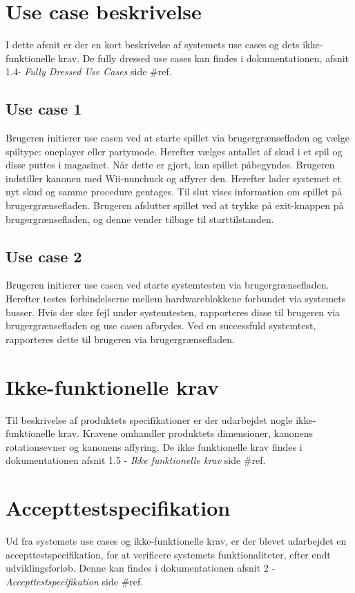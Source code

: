 \newpage
\section{Use case beskrivelse}
I dette afsnit er der en kort beskrivelse af systemets use cases og dets ikke-funktionelle krav. De fully dressed use cases kan findes i dokumentationen, afsnit 1.4- \textit{Fully Dressed Use Cases} side \#ref.

\subsection{Use case 1}
Brugeren initierer use casen ved at starte spillet via brugergrænsefladen og vælge spiltype: oneplayer eller partymode. Herefter vælges antallet af skud i et spil og disse puttes i magasinet. Når dette er gjort, kan spillet påbegyndes. Brugeren indstiller kanonen med Wii-nunchuck og affyrer den. Herefter lader systemet et nyt skud og samme procedure gentages. Til slut vises information om spillet på brugergrænsefladen. Brugeren afslutter spillet ved at trykke på exit-knappen på brugergrænsefladen, og denne vender tilbage til starttilstanden. 

\subsection{Use case 2}
\label{afsnit:usecasebeskrivelseUC2}
Brugeren initierer use casen ved starte systemtesten via brugergrænsefladen. Herefter testes forbindelserne mellem hardwareblokkene forbundet via systemets busser. Hvis der sker fejl under systemtesten, rapporteres disse til brugeren via brugergrænsefladen og use casen afbrydes. Ved en successfuld systemtest, rapporteres dette til brugeren via brugergrænsefladen.

\section{Ikke-funktionelle krav}
Til beskrivelse af produktets specifikationer er der udarbejdet nogle ikke-funktionelle krav. Kravene omhandler produktets dimensioner, kanonens rotationsevner og kanonens affyring. De ikke funktionelle krav findes i dokumentationen afsnit 1.5 - \textit{Ikke funktionelle krav} side \#ref.

\section{Accepttestspecifikation}
Ud fra systemets use cases og ikke-funktionelle krav, er der blevet udarbejdet en accepttestspecifikation, for at verificere systemets funktionaliteter, efter endt udviklingsforløb. Denne kan findes i dokumentationen afsnit 2 - \textit{Accepttestspecifikation} side \#ref. 
